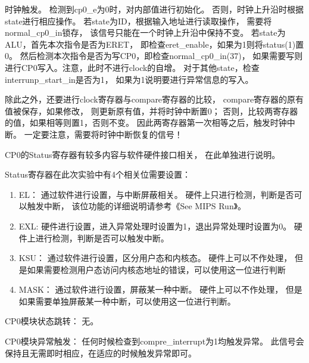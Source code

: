             时钟触发。%
            检测到cp0\_e为0时，对内部值进行初始化。%
            否则，时钟上升沿时根据state进行相应操作。%
            若state为ID，根据输入地址进行读取操作，%
            需要将normal\_cp0\_in锁存，%
            该信号只能在一个时钟上升沿中保持不变。%
            若state为ALU，首先本次指令是否为ERET，%
            即检查eret\_enable，如果为1则将status(1)置0。%
            然后检测本次指令是否为写CP0，即检查normal\_cp0\_in(37)，%
            如果需要写则进行CP0写入。注意，此时不进行clock的自增。%
            对于其他state，检查interrunp\_start\_in是否为1，%
            如果为1说明要进行异常信息的写入。%
            
            除此之外，还要进行clock寄存器与compare寄存器的比较，%
            compare寄存器的原有值被保存，如果修改，%
            则更新原有值，并将时钟中断置0；%
            否则，比较两寄存器的值，如果相等则置1，否则不变。%
            因此两寄存器第一次相等之后，触发时钟中断。%
            一定要注意，需要将时钟中断恢复的信号！

            CP0的Status寄存器有较多内容与软件硬件接口相关，%
            在此单独进行说明。%

            Status寄存器在此次实验中有4个相关位需要设置：
            \begin{enumerate}
            \item
                EL：%
                通过软件进行设置，与中断屏蔽相关。%
                硬件上只进行检测，判断是否可以触发中断，%
                该位功能的详细说明请参考《See MIPS Run》。%
            \item
                EXL:%
                硬件进行设置，进入异常处理时设置为1，退出异常处理时设置为0。%
                硬件上进行检测，判断是否可以触发中断。
            \item
                KSU：%
                通过软件进行设置，区分用户态和内核态。%
                硬件上可以不作处理，%
                但是如果需要检测用户态访问内核态地址的错误，可以使用这一位进行判断
            \item
                MASK：%
                通过软件进行设置，屏蔽某一种中断。%
                硬件上可以不作处理，%
                但是如果需要单独屏蔽某一种中断，可以使用这一位进行判断。
            \end{enumerate}

            CP0模块状态跳转：%
            无。%

            CP0模块异常触发：%
            任何时候检查到compre\_interrupt为1均触发异常。%
            此信号会保持且无需即时相应，在适应的时候触发异常即可。
    
